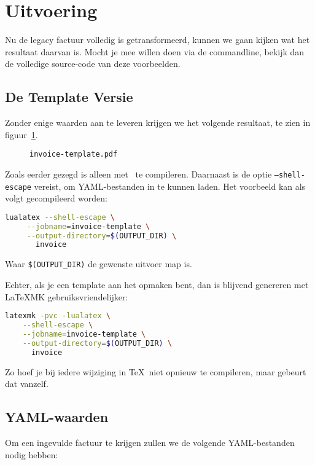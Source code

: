\section{Uitvoering}\label{sec:output}
Nu de legacy factuur volledig is getransformeerd, kunnen we gaan kijken wat het resultaat daarvan is.
Mocht je mee willen doen via de commandline, bekijk dan de volledige source-code\cite{ginvoice-template} van deze voorbeelden.

\subsection{De Template Versie}
Zonder enige waarden aan te leveren krijgen we het volgende resultaat, te zien in figuur~\ref{fig:template}.\\
\setlength\fboxsep{0pt}%
\begin{figure}[!ht]%
    \caption{\texttt{invoice-template.pdf}}\label{fig:template}%
\end{figure}
Zoals eerder gezegd is  alleen met \LuaLaTeX\ te compileren.
Daarnaast is de optie \texttt{--shell-escape} vereist, om YAML-bestanden in te kunnen laden.
Het voorbeeld kan als volgt gecompileerd worden:
\begin{lstlisting}[language=bash,caption={Compileren met \texttt{lualatex}}]
lualatex --shell-escape \
     --jobname=invoice-template \
     --output-directory=$(OUTPUT_DIR) \
       invoice
\end{lstlisting}
Waar \texttt{\$(OUTPUT\_DIR)} de gewenste uitvoer map is.

Echter, als je een template aan het opmaken bent, dan is blijvend genereren met \LaTeX MK gebruiksvriendelijker:
\begin{lstlisting}[language=bash,caption={Compileren met \texttt{latexmk}}]
latexmk -pvc -lualatex \
    --shell-escape \
    --jobname=invoice-template \
    --output-directory=$(OUTPUT_DIR) \
      invoice
\end{lstlisting}
Zo hoef je bij iedere wijziging in \TeX\ niet opnieuw te compileren, maar gebeurt dat vanzelf.

\subsection{YAML-waarden}
Om een ingevulde factuur te krijgen zullen we de volgende YAML-bestanden nodig hebben:

